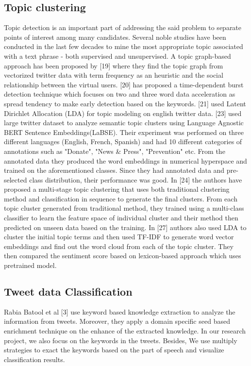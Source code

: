 \subsection{Topic clustering}
Topic detection is an important part of addressing the said problem to
separate points of interest among many candidates. Several noble studies have
been conducted in the last few decades to mine the most appropriate topic
associated with a text phrase - both supervised and unsupervised. A topic
graph-based approach has been proposed by [19] where they find the topic
graph from vectorized twitter data with term frequency as an heuristic and
the social relationship between the virtual users. [20] has proposed a
time-dependent burst detection technique which focuses on two and three word
data acceleration as spread tendency to make early detection based on the
keywords. [21] used Latent Dirichlet Allocation (LDA) for topic modeling on
english twitter data. [23] used large twitter dataset to analyze semantic
topic clusters using Language Agnostic BERT Sentence Embeddings(LaBSE). Their
experiment was performed on three different languages (English, French,
Spanish) and had 10 different categories of annotations such
as "Donate", "News \& Press", "Prevention" etc. From the annotated data they
produced the word embeddings in numerical hyperspace and trained on the
aforementioned classes. Since they had annotated data and pre-selected class
distribution, their performance was good. In [24] the authors have proposed a
multi-stage topic clustering that uses both traditional clustering method and
classification in sequence to generate the final clusters. From each topic
cluster generated from traditional method, they trained using a multi-class
classifier to learn the feature space of individual cluster and their method
then predicted on unseen data based on the training. In [27] authors also
used LDA to cluster the initial topic terms and then used TF-IDF to generate
word vector embeddings and find out the word cloud from each of the topic
cluster. They then compared the sentiment score based on lexicon-based
approach which uses pretrained model.

\subsection{Tweet data Classification}
Rabia Batool et al [3] use keyword based knowledge extraction to analyze the
information from tweets. Moreover, they apply a domain specific seed based
enrichment technique on the enhance of the extracted knowledge. In our
research project, we also focus on the keywords in the tweets. Besides, We
use multiply strategies to exact the keywords based on the part of speech and
visualize classification results. 

